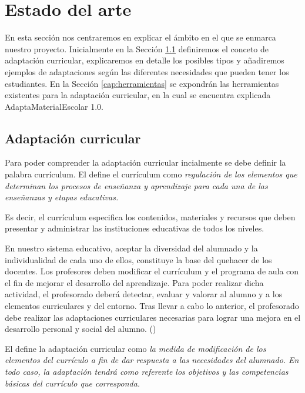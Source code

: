 \chapter{Estado del arte}
\label{cap:estadoDelArte}
En esta sección nos centraremos en explicar el ámbito en el que se enmarca nuestro proyecto. Inicialmente en la Sección \ref{cap:adaptacion} definiremos el conceto de adaptación curricular, explicaremos en detalle los posibles tipos y añadiremos ejemplos de adaptaciones según las diferentes necesidades que pueden tener los estudiantes. En la Sección \ref{cap:herramientas}  se expondrán las herramientas existentes para la adaptación curricular, en la cual se encuentra explicada AdaptaMaterialEscolar 1.0.

\section{Adaptación curricular}\label{cap:adaptacion}
Para poder comprender la adaptación curricular incialmente se debe definir la palabra currículum. El \citep[p. 5, Artículo 2]{BOE2} define el currículum como \textit{ regulación de los elementos que determinan los procesos de enseñanza y aprendizaje para cada una de las enseñanzas y etapas educativas.}
\newline

Es decir, el currículum especifica los contenidos, materiales y recursos que deben presentar y administrar las instituciones educativas de todos los niveles.
\newline

En nuestro sistema educativo, aceptar la diversidad del alumnado y la individualidad de cada uno de ellos, constituye la base del quehacer de los docentes. Los profesores deben modificar el currículum y el programa de aula con el fin de mejorar el desarrollo del aprendizaje. Para poder realizar dicha actividad, el profesorado deberá detectar, evaluar y valorar al alumno y a los elementos curriculares y del entorno. Tras llevar a cabo lo anterior, el profesorado debe realizar las adaptaciones curriculares necesarias para lograr una mejora en el desarrollo personal y social del alumno. (\cite{adaptacionIntro})
\newline

El \citep[p. 7, Artículo 7]{BOE} define la adaptación curricular como \textit{la medida de modificación de los elementos del currículo a fin de dar respuesta a las necesidades del alumnado. En todo caso, la adaptación tendrá como referente los objetivos y las competencias básicas del currículo que corresponda.}
\newline

